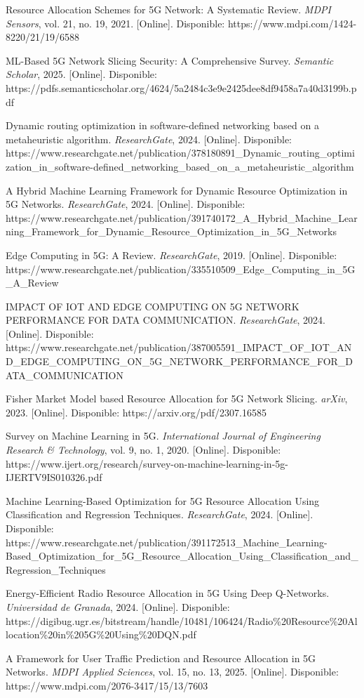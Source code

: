 \documentclass[12pt,a4paper]{article}
\begin{document}
\begin{thebibliography}{99}
Resource Allocation Schemes for 5G Network: A Systematic Review. \emph{MDPI Sensors}, vol. 21, no. 19, 2021. [Online]. Disponible: https://www.mdpi.com/1424-8220/21/19/6588

ML-Based 5G Network Slicing Security: A Comprehensive Survey. \emph{Semantic Scholar}, 2025. [Online]. Disponible: https://pdfs.semanticscholar.org/4624/5a2484c3e9e2425dee8df9458a7a40d3199b.pdf

Dynamic routing optimization in software-defined networking based on a metaheuristic algorithm. \emph{ResearchGate}, 2024. [Online]. Disponible: https://www.researchgate.net/publication/378180891\_Dynamic\_routing\_optimization\_in\_software-defined\_networking\_based\_on\_a\_metaheuristic\_algorithm

A Hybrid Machine Learning Framework for Dynamic Resource Optimization in 5G Networks. \emph{ResearchGate}, 2024. [Online]. Disponible: https://www.researchgate.net/publication/391740172\_A\_Hybrid\_Machine\_Learning\_Framework\_for\_Dynamic\_Resource\_Optimization\_in\_5G\_Networks

Edge Computing in 5G: A Review. \emph{ResearchGate}, 2019. [Online]. Disponible: https://www.researchgate.net/publication/335510509\_Edge\_Computing\_in\_5G\_A\_Review

IMPACT OF IOT AND EDGE COMPUTING ON 5G NETWORK PERFORMANCE FOR DATA COMMUNICATION. \emph{ResearchGate}, 2024. [Online]. Disponible: https://www.researchgate.net/publication/387005591\_IMPACT\_OF\_IOT\_AND\_EDGE\_COMPUTING\_ON\_5G\_NETWORK\_PERFORMANCE\_FOR\_DATA\_COMMUNICATION

Fisher Market Model based Resource Allocation for 5G Network Slicing. \emph{arXiv}, 2023. [Online]. Disponible: https://arxiv.org/pdf/2307.16585

Survey on Machine Learning in 5G. \emph{International Journal of Engineering Research \& Technology}, vol. 9, no. 1, 2020. [Online]. Disponible: https://www.ijert.org/research/survey-on-machine-learning-in-5g-IJERTV9IS010326.pdf

Machine Learning-Based Optimization for 5G Resource Allocation Using Classification and Regression Techniques. \emph{ResearchGate}, 2024. [Online]. Disponible: https://www.researchgate.net/publication/391172513\_Machine\_Learning-Based\_Optimization\_for\_5G\_Resource\_Allocation\_Using\_Classification\_and\_Regression\_Techniques

Energy-Efficient Radio Resource Allocation in 5G Using Deep Q-Networks. \emph{Universidad de Granada}, 2024. [Online]. Disponible: https://digibug.ugr.es/bitstream/handle/10481/106424/Radio\%20Resource\%20Allocation\%20in\%205G\%20Using\%20DQN.pdf

A Framework for User Traffic Prediction and Resource Allocation in 5G Networks. \emph{MDPI Applied Sciences}, vol. 15, no. 13, 2025. [Online]. Disponible: https://www.mdpi.com/2076-3417/15/13/7603

\end{thebibliography}
\end{document}

